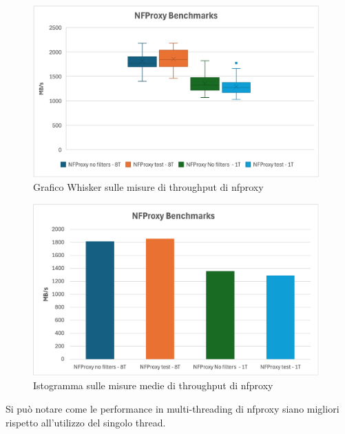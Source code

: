 \begin{figure}[H]
    \centering
    \includegraphics[width=0.98\textwidth]{images/chapter4/whisker_nfproxy.png}
    \caption{Grafico Whisker sulle misure di throughput di nfproxy}
    \label{fig:wisker_nfproxy}
\end{figure}

\begin{figure}[H]
    \centering
    \includegraphics[width=0.98\textwidth]{images/chapter4/istogramma_nfproxy.png}
    \caption{Istogramma sulle misure medie di throughput di nfproxy}
    \label{fig:istogramma_nfproxy}
\end{figure}

Si può notare come le performance in multi-threading di nfproxy siano migliori rispetto all'utilizzo del singolo thread.

